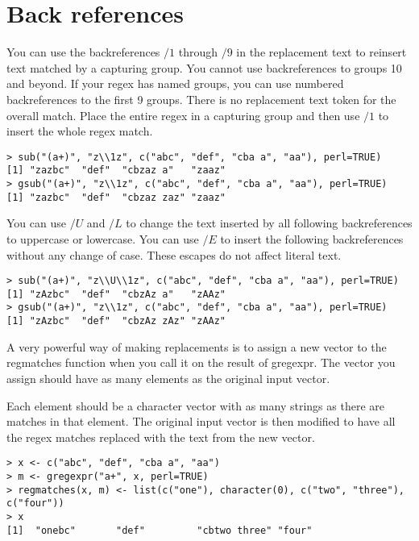 \documentclass{article}
\begin{document}
\section{Back references}
You can use the backreferences $\slash 1$ through $\slash 9$ in the replacement text to reinsert text matched by a capturing group. You cannot use backreferences to groups 10 and beyond. If your regex has named groups, you can use numbered backreferences to the first 9 groups. There is no replacement text token for the overall match. Place the entire regex in a capturing group and then use $\slash 1$ to insert the whole regex match.
\begin{verbatim}
> sub("(a+)", "z\\1z", c("abc", "def", "cba a", "aa"), perl=TRUE)
[1] "zazbc"  "def"  "cbzaz a"   "zaaz"   
> gsub("(a+)", "z\\1z", c("abc", "def", "cba a", "aa"), perl=TRUE)
[1] "zazbc"  "def"  "cbzaz zaz" "zaaz"
\end{verbatim}
You can use $\slash U$ and $\slash L$ to change the text inserted by all following backreferences to uppercase or lowercase. You can use $\slash E$ to insert the following backreferences without any change of case. These escapes do not affect literal text.
\begin{verbatim}
> sub("(a+)", "z\\U\\1z", c("abc", "def", "cba a", "aa"), perl=TRUE)
[1] "zAzbc"  "def"  "cbzAz a"   "zAAz"   
> gsub("(a+)", "z\\1z", c("abc", "def", "cba a", "aa"), perl=TRUE)
[1] "zAzbc"  "def"  "cbzAz zAz" "zAAz"
\end{verbatim}
A very powerful way of making replacements is to assign a new vector to the regmatches function when you call it on the result of gregexpr. The vector you assign should have as many elements as the original input vector. 

Each element should be a character vector with as many strings as there are matches in that element. The original input vector is then modified to have all the regex matches replaced with the text from the new vector.
\begin{verbatim}
> x <- c("abc", "def", "cba a", "aa")
> m <- gregexpr("a+", x, perl=TRUE)
> regmatches(x, m) <- list(c("one"), character(0), c("two", "three"), c("four"))
> x
[1]  "onebc"       "def"         "cbtwo three" "four"
\end{verbatim}
\end{document}
